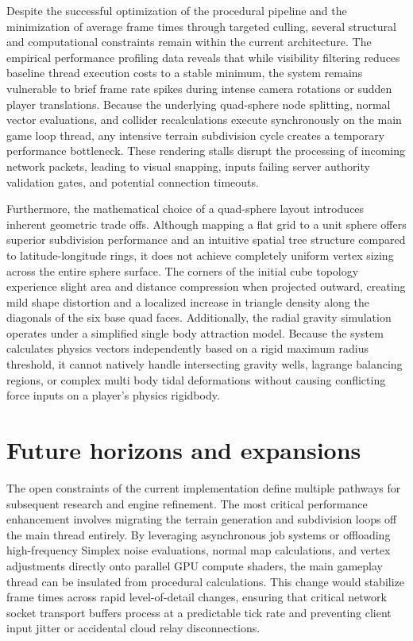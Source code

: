 \documentclass[12pt]{report}
\begin{document}
Despite the successful optimization of the procedural pipeline and the minimization of average frame times through targeted culling, several structural and computational constraints remain within the current architecture. The empirical performance profiling data reveals that while visibility filtering reduces baseline thread execution costs to a stable minimum, the system remains vulnerable to brief frame rate spikes during intense camera rotations or sudden player translations. Because the underlying quad-sphere node splitting, normal vector evaluations, and collider recalculations execute synchronously on the main game loop thread, any intensive terrain subdivision cycle creates a temporary performance bottleneck. These rendering stalls disrupt the processing of incoming network packets, leading to visual snapping, inputs failing server authority validation gates, and potential connection timeouts.

Furthermore, the mathematical choice of a quad-sphere layout introduces inherent geometric trade offs. Although mapping a flat grid to a unit sphere offers superior subdivision performance and an intuitive spatial tree structure compared to latitude-longitude rings, it does not achieve completely uniform vertex sizing across the entire sphere surface. The corners of the initial cube topology experience slight area and distance compression when projected outward, creating mild shape distortion and a localized increase in triangle density along the diagonals of the six base quad faces. Additionally, the radial gravity simulation operates under a simplified single body attraction model. Because the system calculates physics vectors independently based on a rigid maximum radius threshold, it cannot natively handle intersecting gravity wells, lagrange balancing regions, or complex multi body tidal deformations without causing conflicting force inputs on a player's physics rigidbody.

\section{Future horizons and expansions}

The open constraints of the current implementation define multiple pathways for subsequent research and engine refinement. The most critical performance enhancement involves migrating the terrain generation and subdivision loops off the main thread entirely. By leveraging asynchronous job systems or offloading high-frequency Simplex noise evaluations, normal map calculations, and vertex adjustments directly onto parallel GPU compute shaders, the main gameplay thread can be insulated from procedural calculations. This change would stabilize frame times across rapid level-of-detail changes, ensuring that critical network socket transport buffers process at a predictable tick rate and preventing client input jitter or accidental cloud relay disconnections.
\end{document}
